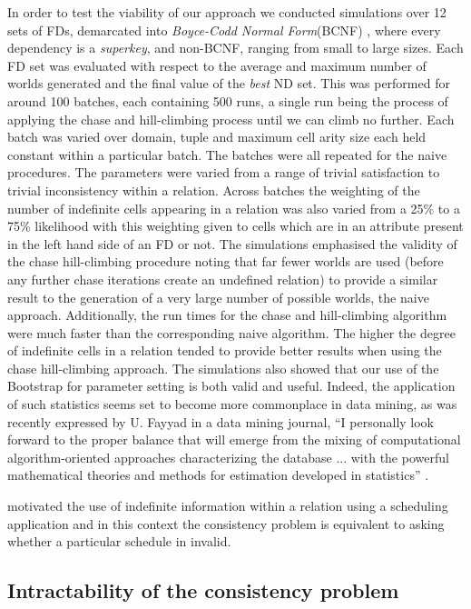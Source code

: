 In order to test the viability of our approach we conducted simulations
over 12 sets of FDs, demarcated into {\em Boyce-Codd Normal
Form}(BCNF) \cite{Mann92}, where every dependency is a {\em superkey},
and non-BCNF, ranging from small to large sizes. 
 Each FD set was evaluated with respect to the average and maximum number
of worlds generated and the final value of the {\em best} ND set.
This was performed for around 100 batches, each containing 500 runs, a
single run being the process of applying the 
chase and hill-climbing process until we can climb no further. 
Each batch was varied over domain, tuple
and maximum cell arity size each held constant within a
particular batch. The batches were all repeated for the naive procedures. The
parameters 
were varied from a range of trivial satisfaction to trivial inconsistency
within a relation. Across batches the weighting of the number of 
indefinite cells appearing in a relation was also varied from a 25\%
to a 75\% likelihood with this weighting given to cells which are
in an attribute present in the left hand side of an FD or not.
The simulations
emphasised the validity of the chase hill-climbing procedure noting that
far fewer worlds are used (before any further chase iterations create
an undefined relation) to provide a similar result to the generation of
a very large number of possible worlds, the naive
approach. Additionally, the run times for the chase and hill-climbing
algorithm were much faster than the corresponding naive algorithm. The higher
the degree of indefinite cells in a relation tended to provide better
results when using the chase hill-climbing approach.
 The simulations also showed that our
use of the Bootstrap for parameter setting is both valid and useful.
Indeed, the application of such statistics seems set to become more
commonplace in data mining, as was recently expressed by U. Fayyad in
a data mining journal, ``I personally look forward to the
proper balance that
will emerge from the mixing of computational algorithm-oriented
approaches characterizing the database ... with the powerful
mathematical theories and methods for estimation developed in statistics''
\cite{fay98}.

\cite{inv91} motivated the use of indefinite information within a 
relation using a scheduling application and in this context the consistency problem is equivalent to
asking whether a particular schedule in invalid.

\subsection{Intractability of the consistency problem}

